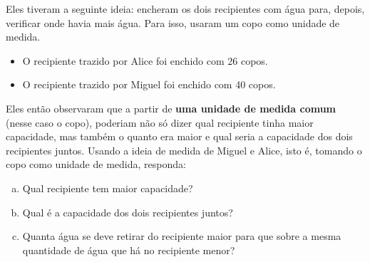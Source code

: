 \begin{atividade}{}
Eles tiveram a seguinte ideia: encheram os dois recipientes com água para, depois, verificar onde havia mais água. Para isso, usaram um copo como unidade de medida.
\begin{itemize}
 \item O recipiente trazido por Alice foi enchido com 26 copos.
 \item O recipiente trazido por Miguel foi enchido com 40 copos.
\end{itemize}
Eles então observaram que a partir de {\bf uma unidade de medida comum} (nesse caso o copo), poderiam não só dizer qual recipiente tinha maior capacidade, mas também o quanto era maior e qual seria a capacidade dos dois recipientes juntos.
Usando a ideia de medida de Miguel e Alice, isto é, tomando o copo como unidade de medida, responda:
  \begin{enumerate}[a)]
   \item Qual recipiente tem maior capacidade?
   \item Qual é a capacidade dos dois recipientes juntos?
   \item Quanta água se deve retirar do recipiente maior para que sobre a mesma quantidade de água que há no recipiente menor?
  \end{enumerate}
\end{atividade}

